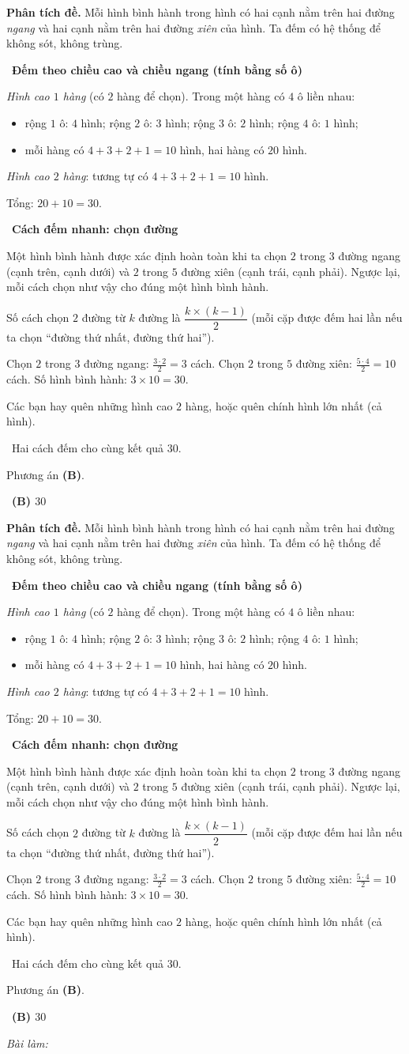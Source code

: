 \documentclass[11pt]{article}
\newif\ifsol \soltrue
\providecommand{\AnsWord}{Đáp số}
\newcommand{\ans}[1]{\par\smallskip{\bfseries\color{tmGreen!88!black}\AnsWord:}\ {\bfseries\color{AnsRed}#1}\par}
\newcommand{\probsol}[1]{%
  \begin{lrbox}{\solmeasure}\begin{minipage}{\dimexpr\linewidth-24pt\relax}#1\end{minipage}\end{lrbox}%
  \ifsol
    \begin{solbox}#1\end{solbox}%
  \else
    \setlength{\solht}{\dimexpr\ht\solmeasure+\dp\solmeasure+0.85cm\relax}%
    \ifdim\solht<1.35cm\setlength{\solht}{1.35cm}\fi
    \ifdim\solht>\StudentMaxWork\setlength{\solht}{\StudentMaxWork}\fi
    \begin{tcolorbox}[colback=white,colframe=Line,boxrule=0.8pt,arc=5pt,
      left=8pt,right=8pt,top=4pt,bottom=4pt,height=\solht]{\footnotesize\color{Slate}\itshape\WorkWord}\end{tcolorbox}%
  \fi}
\newlength{\StudentMaxWork}\setlength{\StudentMaxWork}{7.5cm}
\newcommand{\step}[2]{\par\smallskip\noindent{\bfseries\color{tmBlue!85!black}\StepWord~#1.}\ {\bfseries #2}\par\nopagebreak}
\newcommand{\verify}[1]{\par\smallskip\noindent{\bfseries\color{tmGreen!80!black}\faCheckCircle\ \CheckWord}\ #1\par}
\def\WorkWord{Bài làm:}
\def\AnsWord{Đáp số}
\def\StepWord{Bước}
\def\CheckWord{Thử lại:}
\begin{document}
\probsol{
\textbf{Phân tích đề.} Mỗi hình bình hành trong hình có hai cạnh nằm trên hai đường \emph{ngang} và hai cạnh
nằm trên hai đường \emph{xiên} của hình. Ta đếm có hệ thống để không sót, không trùng.

\step{1}{Đếm theo chiều cao và chiều ngang (tính bằng số ô)}
\emph{Hình cao $1$ hàng} (có $2$ hàng để chọn). Trong một hàng có $4$ ô liền nhau:
\begin{itemize}[leftmargin=1.4em,itemsep=1pt]
\item rộng $1$ ô: $4$ hình; rộng $2$ ô: $3$ hình; rộng $3$ ô: $2$ hình; rộng $4$ ô: $1$ hình;
\item mỗi hàng có $4+3+2+1=10$ hình, hai hàng có $20$ hình.
\end{itemize}
\emph{Hình cao $2$ hàng}: tương tự có $4+3+2+1=10$ hình.

Tổng: $20+10=30$.

\step{2}{Cách đếm nhanh: chọn đường}
\begin{proofbox}Một hình bình hành được xác định hoàn toàn khi ta chọn $2$ trong $3$ đường ngang (cạnh trên,
cạnh dưới) và $2$ trong $5$ đường xiên (cạnh trái, cạnh phải). Ngược lại, mỗi cách chọn như vậy cho đúng một
hình bình hành.\end{proofbox}
\begin{recallbox}Số cách chọn $2$ đường từ $k$ đường là $\dfrac{k\times(k-1)}{2}$ (mỗi cặp được đếm hai lần
nếu ta chọn ``đường thứ nhất, đường thứ hai'').\end{recallbox}
Chọn $2$ trong $3$ đường ngang: $\tfrac{3\cdot 2}{2}=3$ cách. Chọn $2$ trong $5$ đường xiên:
$\tfrac{5\cdot4}{2}=10$ cách. Số hình bình hành: $3\times 10=30$.

\begin{warnbox}Các bạn hay quên những hình cao $2$ hàng, hoặc quên chính hình lớn nhất (cả hình).\end{warnbox}
\verify{Hai cách đếm cho cùng kết quả $30$.}
Phương án \textbf{(B)}.
\ans{(B) $30$}
}
\end{document}
